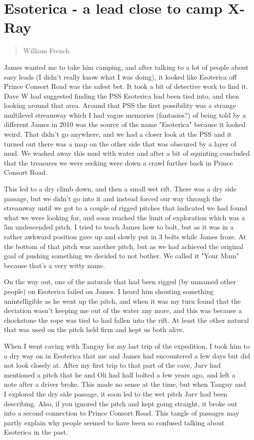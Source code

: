 \documentclass[onecolumn]{book}
\begin{document}
\section{Esoterica - a lead close to camp X-Ray}
\begin{verse}
William French
\end{verse}

James wanted me to take him camping, and after talking to a lot of people about easy leads (I didn't really know what I was doing), it looked like Esoterica off Prince Consort Road was the safest bet. It took a bit of detective work to find it. Dave W had suggested finding the PSS Esoterica had been tied into, and then looking around that area. Around that PSS the first possibility was a strange multilevel streamway which I had vague memories (fantasies?) of being told by a different James in 2010 was the source of the name "Esoterica" because it looked weird. That didn't go anywhere, and we had a closer look at the PSS and it turned out there was a map on the other side that was obscured by a layer of mud. We washed away this mud with water and after a bit of squinting concluded that the treasures we were seeking were down a crawl further back in Prince Consort Road.

This led to a dry climb down, and then a small wet rift. There was a dry side passage, but we didn't go into it and instead forced our way through the streamway until we got to a couple of rigged pitches that indicated we had found what we were looking for, and soon reached the limit of exploration which was a 5m undescended pitch. I tried to teach James how to bolt, but as it was in a rather awkward position gave up and slowly put in 3 bolts while James froze. At the bottom of that pitch was another pitch, but as we had achieved the original goal of pushing something we decided to not bother. We called it "Your Mum" because that's a very witty name. 

On the way out, one of the naturals that had been rigged (by unnamed other people) on Esoterica failed on James. I heard him shouting something unintelligible as he went up the pitch, and when it was my turn found that the deviation wasn't keeping me out of the water any more, and this was because a chockstone the rope was tied to had fallen into the rift. At least the other natural that was used on the pitch held firm and kept us both alive.


When I went caving with Tanguy for my last trip of the expedition, I took him to a dry way on in Esoterica that me and James had encountered a few days but did not look closely at. After my first trip to that part of the cave, Jarv had mentioned a pitch that he and Oli had half bolted a few years ago, and left a note after a driver broke. This made no sense at the time, but when Tanguy and I explored the dry side passage, it soon led to the wet pitch Jarv had been describing. Also, if you ignored the pitch and kept going straight, it broke out into a second connection to Prince Consort Road. This tangle of passages may partly explain why people seemed to have been so confused talking about Esoterica in the past. 
\end{document}
